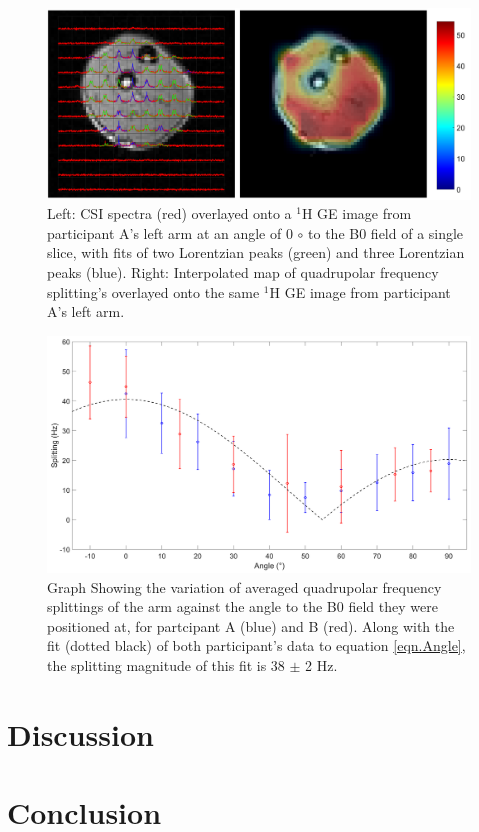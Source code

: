\documentclass[class=article, crop=false]{standalone}
\begin{document}
\begin{figure}
    \centering
    \includegraphics[width=1\textwidth]{Figures/D2O/Arm_A.png}
    \caption{Left: CSI spectra (red) overlayed onto a $^1$H GE image from participant A's left arm at an angle of 0 ${\circ}$ to the B0 field of a single slice, with fits of two Lorentzian peaks (green) and three Lorentzian peaks (blue). Right: Interpolated map of quadrupolar frequency splitting's overlayed onto the same $^1$H GE image from participant A's left arm. }
    \label{fig:D2O:Arm_A}
\end{figure}

\begin{figure}
    \centering
    \includegraphics[width=1\textwidth]{Figures/D2O/Split_Angle.png}
    \caption{Graph Showing the variation of averaged quadrupolar frequency splittings of the arm against the angle to the B0 field they were positioned at, for partcipant A (blue) and B (red). Along with the fit (dotted black) of both participant's data to equation \ref{eqn.Angle}, the splitting magnitude of this fit is 38 $\pm$ 2 Hz.}
    \label{fig:D2O:Split_Angle}
\end{figure}

\section{Discussion}

\section{Conclusion}

\end{document}
